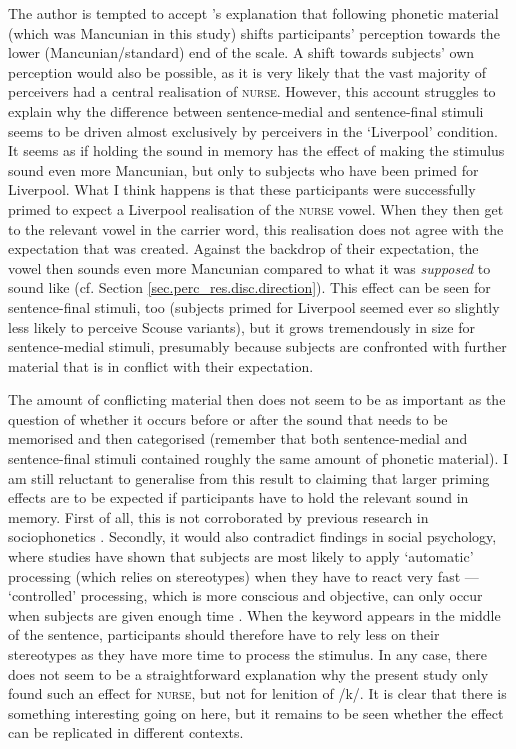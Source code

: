 The author is tempted to accept \textcite{hayetal2006a}'s explanation that following phonetic material (which was Mancunian in this study) shifts participants' perception towards the lower (Mancunian/standard) end of the scale.
A shift towards subjects' own perception would also be possible, as it is very likely that the vast majority of perceivers had a central realisation of \textsc{nurse}.
However, this account struggles to explain why the difference between sentence-medial and sentence-final stimuli seems to be driven almost exclusively by perceivers in the `Liverpool' condition.
It seems as if holding the sound in memory has the effect of making the stimulus sound even more Mancunian, but only to subjects who have been primed for Liverpool.
What I think happens is that these participants were successfully primed to expect a Liverpool realisation of the \textsc{nurse} vowel.
When they then get to the relevant vowel in the carrier word, this realisation does not agree with the expectation that was created.
Against the backdrop of their expectation, the vowel then sounds even more Mancunian compared to what it was \emph{supposed} to sound like (cf. Section \ref{sec.perc_res.disc.direction}).
This effect can be seen for sentence-final stimuli, too (subjects primed for Liverpool seemed ever so slightly less likely to perceive Scouse variants), but it grows tremendously in size for sentence-medial stimuli, presumably because subjects are confronted with further material that is in conflict with their expectation.

The amount of conflicting material then does not seem to be as important as the question of whether it occurs before or after the sound that needs to be memorised and then categorised (remember that both sentence-medial and sentence-final stimuli contained roughly the same amount of phonetic material).
I am still reluctant to generalise from this result to claiming that larger priming effects are to be expected if participants have to hold the relevant sound in memory.
First of all, this is not corroborated by previous research in sociophonetics \parencite{hayetal2006a,haydrager2010}.
Secondly, it would also contradict findings in social psychology, where studies have shown that subjects are most likely to apply `automatic' processing (which relies on stereotypes) when they have to react very fast --- `controlled' processing, which is more conscious and objective, can only occur when subjects are given enough time \parencite[cf.][33--34]{petersensix2008}.
When the keyword appears in the middle of the sentence, participants should therefore have to rely less on their stereotypes as they have more time to process the stimulus.
In any case, there does not seem to be a straightforward explanation why the present study only found such an effect for \textsc{nurse}, but not for lenition of /k/.
It is clear that there is something interesting going on here, but it remains to be seen whether the effect can be replicated in different contexts.

